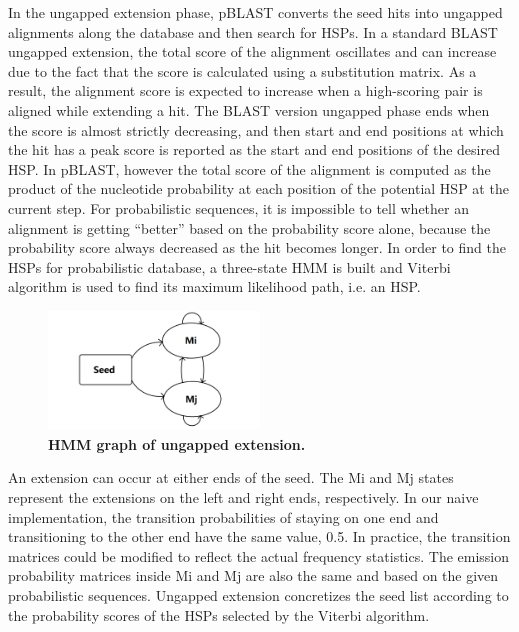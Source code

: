\documentclass[12pt]{article}
\begin{document}
In the ungapped extension phase, pBLAST converts the seed hits into ungapped alignments along the database and then search for HSPs. In a standard BLAST ungapped extension, the total score of the alignment oscillates and can increase due to the fact that the score is calculated using a substitution matrix. As a result, the alignment score is expected to increase when a high-scoring pair is aligned while extending a hit.  The BLAST version ungapped phase ends when the score is almost strictly decreasing, and then start and end positions at which the hit has a peak score is reported as the start and end positions of the desired HSP. In pBLAST, however the total score of the alignment is computed as the product of the nucleotide probability at each position of the potential HSP at the current step. For probabilistic sequences, it is impossible to tell whether an alignment is getting “better” based on the probability score alone, because the probability score  always decreased as the hit becomes longer. In order to find the HSPs for probabilistic database, a three-state HMM is built and Viterbi algorithm is used to find its maximum likelihood path, i.e. an HSP. 
	
    \begin{figure}
        \centering
		\includegraphics[width=0.5\textwidth,trim={0.5cm 0.5cm 0.5cm 0cm},clip]{fig3} %
		\caption{\textbf{HMM graph of ungapped extension.}}
		\label{fig:ugappedHMMGraph}
	\end{figure}

An extension can occur at either ends of the seed. The Mi and Mj states represent the extensions on the left and right ends, respectively. In our naive implementation, the transition probabilities of staying on one end and transitioning to the other end have the same value, 0.5. In practice, the transition matrices could be modified to reflect the actual frequency statistics. The emission probability matrices inside Mi and Mj are also the same and based on the given probabilistic sequences. Ungapped extension concretizes the seed list according to the probability scores of the HSPs selected by the Viterbi algorithm.
\end{document}
